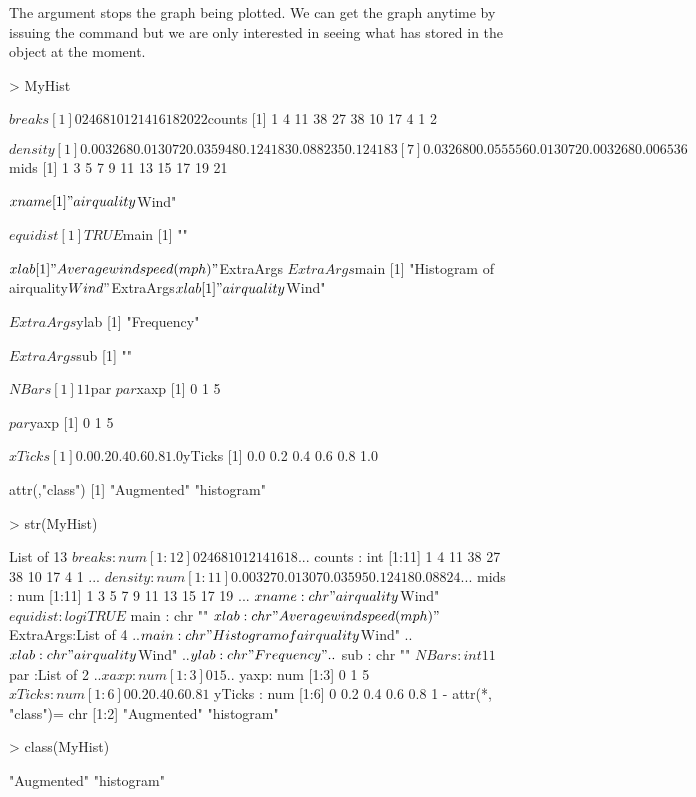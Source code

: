 The  argument stops the graph being plotted. We can get the graph anytime by issuing the  command but we are only interested in seeing what \R{} has stored in the  object at the moment.  

\begin{Schunk}
\begin{Sinput}
> MyHist 
\end{Sinput}
\begin{Soutput}
$breaks
 [1]  0  2  4  6  8 10 12 14 16 18 20 22

$counts
 [1]  1  4 11 38 27 38 10 17  4  1  2

$density
 [1] 0.003268 0.013072 0.035948 0.124183 0.088235 0.124183
 [7] 0.032680 0.055556 0.013072 0.003268 0.006536

$mids
 [1]  1  3  5  7  9 11 13 15 17 19 21

$xname
[1] "airquality$Wind"

$equidist
[1] TRUE

$main
[1] ""

$xlab
[1] "Average wind speed (mph)"

$ExtraArgs
$ExtraArgs$main
[1] "Histogram of airquality$Wind"

$ExtraArgs$xlab
[1] "airquality$Wind"

$ExtraArgs$ylab
[1] "Frequency"

$ExtraArgs$sub
[1] ""


$NBars
[1] 11

$par
$par$xaxp
[1] 0 1 5

$par$yaxp
[1] 0 1 5


$xTicks
[1] 0.0 0.2 0.4 0.6 0.8 1.0

$yTicks
[1] 0.0 0.2 0.4 0.6 0.8 1.0

attr(,"class")
[1] "Augmented" "histogram"
\end{Soutput}
\begin{Sinput}
> str(MyHist) 
\end{Sinput}
\begin{Soutput}
List of 13
 $ breaks   : num [1:12] 0 2 4 6 8 10 12 14 16 18 ...
 $ counts   : int [1:11] 1 4 11 38 27 38 10 17 4 1 ...
 $ density  : num [1:11] 0.00327 0.01307 0.03595 0.12418 0.08824 ...
 $ mids     : num [1:11] 1 3 5 7 9 11 13 15 17 19 ...
 $ xname    : chr "airquality$Wind"
 $ equidist : logi TRUE
 $ main     : chr ""
 $ xlab     : chr "Average wind speed (mph)"
 $ ExtraArgs:List of 4
  ..$ main: chr "Histogram of airquality$Wind"
  ..$ xlab: chr "airquality$Wind"
  ..$ ylab: chr "Frequency"
  ..$ sub : chr ""
 $ NBars    : int 11
 $ par      :List of 2
  ..$ xaxp: num [1:3] 0 1 5
  ..$ yaxp: num [1:3] 0 1 5
 $ xTicks   : num [1:6] 0 0.2 0.4 0.6 0.8 1
 $ yTicks   : num [1:6] 0 0.2 0.4 0.6 0.8 1
 - attr(*, "class")= chr [1:2] "Augmented" "histogram"
\end{Soutput}
\begin{Sinput}
> class(MyHist) 
\end{Sinput}
\begin{Soutput}
[1] "Augmented" "histogram"
\end{Soutput}
\end{Schunk}

